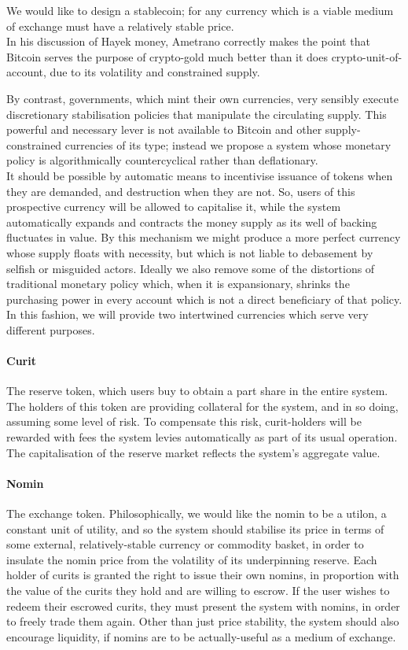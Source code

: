 \documentclass{article}
\begin{document}
We would like to design a stablecoin; for any currency which is a viable medium of exchange
must have a relatively stable price.\\

In his discussion of Hayek money, Ametrano correctly makes the point that Bitcoin
serves the purpose of crypto-gold much better than it does crypto-unit-of-account, due to its volatility and
constrained supply.~\cite{ametrano2016hayek}

\noindent By contrast, governments, which mint their own currencies, very sensibly execute discretionary
stabilisation policies that manipulate the circulating supply.
This powerful and necessary lever is not available to Bitcoin and other supply-constrained
currencies of its type; instead we propose a system whose monetary policy is algorithmically
countercyclical rather than deflationary. \\

It should be possible by automatic means to incentivise issuance of tokens when they are demanded,
and destruction when they are not. So, users of this prospective currency will be allowed to
capitalise it, while the system automatically expands and contracts the money supply as its well of backing
fluctuates in value. By this mechanism we might produce a more perfect currency whose supply floats with
necessity, but which is not liable to debasement by selfish or misguided actors.
Ideally we also remove some of the distortions of traditional monetary policy which, when it is expansionary,
shrinks the purchasing power in every account which is not a direct beneficiary of that policy.
In this fashion, we will provide two intertwined currencies which serve very different purposes.

\paragraph{Curit} The reserve token, which users buy to obtain a part share in the entire system. The holders
of this token are providing collateral for the system, and in so doing, assuming some level of risk.
To compensate this risk, curit-holders will be rewarded with fees the system levies automatically as
part of its usual operation. The capitalisation of the reserve market reflects the system's aggregate value.

\paragraph{Nomin} The exchange token. Philosophically, we would like the nomin to be a utilon, a constant
unit of utility, and so the system should stabilise its price in terms of some external, relatively-stable
currency or commodity basket, in order to insulate the nomin price from the volatility of its 
underpinning reserve. Each holder of curits is granted the right to issue their own nomins, in proportion
with the value of the curits they hold and are willing to escrow. If the user wishes to redeem their escrowed curits,
they must present the system with nomins, in order to freely trade them again. Other than just price stability,
the system should also encourage liquidity, if nomins are to be actually-useful as a medium of exchange.
\end{document}

